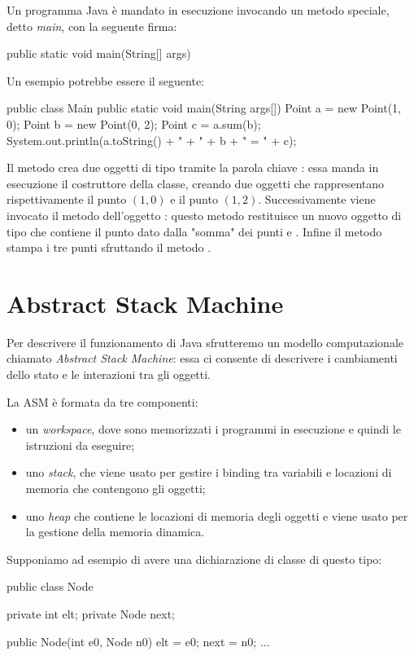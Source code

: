 Un programma Java è mandato in esecuzione invocando un metodo speciale, detto \emph{main}, con la seguente firma:
\begin{Java}
    public static void main(String[] args)
\end{Java}

Un esempio potrebbe essere il seguente:
\begin{Java}
    public class Main {
    public static void main(String args[]){
        Point a = new Point(1, 0);
        Point b = new Point(0, 2);
        Point c = a.sum(b);
        System.out.println(a.toString() + " + " + b + " = " + c);
    }
}
\end{Java}

Il metodo  crea due oggetti di tipo  tramite la parola chiave : essa manda in esecuzione il costruttore della classe, creando due oggetti che rappresentano rispettivamente il punto $(1, 0)$ e il punto $(1, 2)$.
Successivamente viene invocato il metodo  dell'oggetto : questo metodo restituisce un nuovo oggetto di tipo  che contiene il punto dato dalla "somma" dei punti  e . 
Infine il metodo stampa i tre punti sfruttando il metodo .

\section{Abstract Stack Machine}

Per descrivere il funzionamento di Java sfrutteremo un modello computazionale chiamato \emph{Abstract Stack Machine}: essa ci consente di descrivere i cambiamenti dello stato e le interazioni tra gli oggetti.

La ASM è formata da tre componenti:
\begin{itemize}
    \item un \emph{workspace}, dove sono memorizzati i programmi in esecuzione e quindi le istruzioni da eseguire;
    \item uno \emph{stack}, che viene usato per gestire i binding tra variabili e locazioni di memoria che contengono gli oggetti;
    \item uno \emph{heap} che contiene le locazioni di memoria degli oggetti e viene usato per la gestione della memoria dinamica.
\end{itemize}

Supponiamo ad esempio di avere una dichiarazione di classe di questo tipo:
\begin{Java}
    public class Node{
        private int elt;
        private Node next;

        public Node(int e0, Node n0){
            elt = e0;
            next = n0;
        }
        ...
    }
\end{Java}

